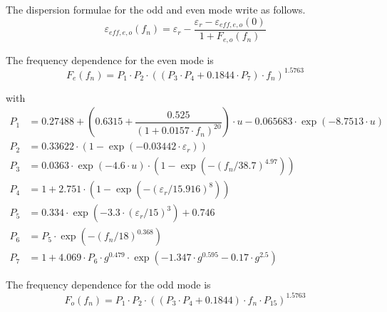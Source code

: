 \documentclass[10pt]{report}
\begin{document}
\addvspace{12pt}

The dispersion formulae for the odd and even mode write as follows.
\begin{equation}
\varepsilon_{eff,e,o}\left(f_n\right) = \varepsilon_r - \dfrac{\varepsilon_r - \varepsilon_{eff,e,o}(0)}{1+F_{e,o}\left(f_n\right)}
\end{equation}

The frequency dependence for the even mode is
\begin{equation}
F_e\left(f_n\right) = P_1\cdot P_2\cdot \left(\left(P_3\cdot P_4 + 0.1844\cdot P_7\right)\cdot f_n\right)^{1.5763}
\end{equation}

with
\begin{align}
P_1 &= 0.27488 + \left( 0.6315 + \dfrac{0.525}{(1+0.0157\cdot f_n)^{20}} \right) \cdot u
     -0.065683\cdot\exp{\left(-8.7513\cdot u\right)}\\
P_2 &= 0.33622\cdot \left(1-\exp{\left(-0.03442\cdot\varepsilon_r\right)}\right)\\
P_3 &= 0.0363\cdot\exp{\left(-4.6\cdot u\right)}\cdot\left( 1-\exp\left(
    -\left( f_n / 38.7\right) ^{4.97} \right) \right)\\
P_4 &= 1 + 2.751\cdot\left( 1-\exp\left( -\left( \varepsilon_r/15.916\right) ^8 \right) \right)\\
P_5 &= 0.334\cdot\exp\left( -3.3\cdot\left( \varepsilon_r/15\right) ^3 \right) + 0.746\\
P_6 &= P_5\cdot\exp\left( -\left( f_n/18\right) ^{0.368} \right)\\
P_7 &= 1 + 4.069\cdot P_6 \cdot g^{0.479}\cdot\exp\left(-1.347\cdot g^{0.595} - 0.17\cdot g^{2.5} \right)
\end{align}

The frequency dependence for the odd mode is
\begin{equation}
F_o\left(f_n\right) = P_1\cdot P_2\cdot \left(\left(P_3\cdot P_4 + 0.1844\right)\cdot f_n\cdot P_{15}\right)^{1.5763}
\end{equation}
\end{document}
